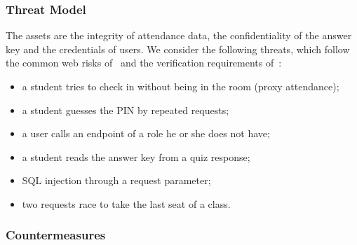 \subsubsection{Threat Model}

The assets are the integrity of attendance data, the confidentiality of the answer key and the credentials of users. We consider the following threats, which follow the common web risks of~\cite{owasptop10} and the verification requirements of~\cite{owaspasvs}:

\begin{itemize}
    \item a student tries to check in without being in the room (proxy attendance);
    \item a student guesses the PIN by repeated requests;
    \item a user calls an endpoint of a role he or she does not have;
    \item a student reads the answer key from a quiz response;
    \item SQL injection through a request parameter;
    \item two requests race to take the last seat of a class.
\end{itemize}

\subsubsection{Countermeasures}

